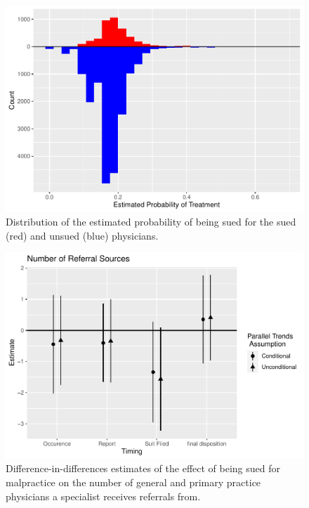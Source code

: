 \documentclass[
  12pt,
]{article}
\begin{document}
\begin{figure}
\centering
\includegraphics{Paper_files/figure-latex/histpscore-1.pdf}
\caption{\label{fig:histpscore}Distribution of the estimated probability of being sued for the sued (red) and unsued (blue) physicians.}
\end{figure}

\FloatBarrier

\FloatBarrier

\begin{figure}
\centering
\includegraphics{Paper_files/figure-latex/nsrcatt-1.pdf}
\caption{\label{fig:nsrcatt}Difference-in-differences estimates of the effect of being sued for malpractice on the number of general and primary practice physicians a specialist receives referrals from.}
\end{figure}
\end{document}

